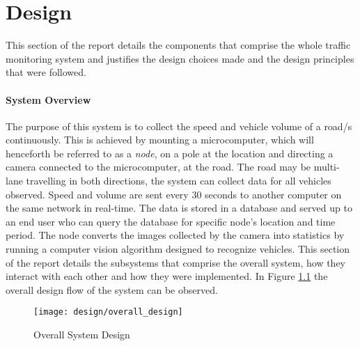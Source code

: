 \chapter{Design}

This section of the report details the components that comprise the whole traffic monitoring system and justifies the design choices made and the design principles that were followed.

\subsubsection{System Overview}

The purpose of this system is to collect the speed and vehicle volume of a road/s continuously. This is achieved by mounting a microcomputer, which will henceforth be referred to as a \emph{node}, on a pole at the location and directing a camera connected to the microcomputer, at the road. The road may be multi-lane travelling in both directions, the system can collect data for all vehicles observed. Speed and volume are sent every 30 seconds to another computer on the same network in real-time. The data is stored in a database and served up to an end user who can query the database for specific node's location and time period. The node converts the images collected by the camera into statistics by running a computer vision algorithm designed to recognize vehicles. This section of the report details the subsystems that comprise the overall system, how they interact with each other and how they were implemented. In Figure \ref{fig:overall_design} the overall design flow of the system can be observed. 

\begin{figure}[H]
    \centering
    \texttt{[image: design/overall\_design]}
    \caption{Overall System Design}
    \label{fig:overall_design}
\end{figure}




